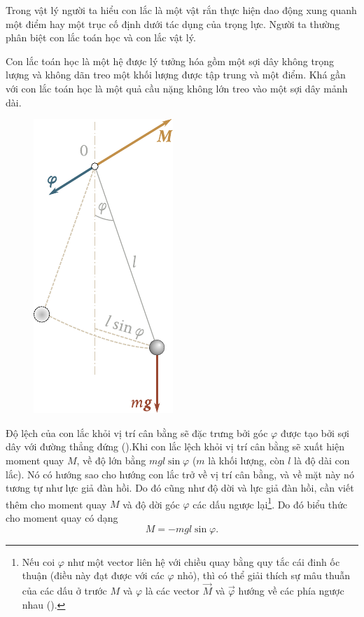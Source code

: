 Trong vật lý người ta hiểu con lắc là một vật rắn thực hiện dao động xung quanh một điểm hay một trục cố định dưới tác dụng của trọng lực. Người ta thường phân biệt con lắc toán học và con lắc vật lý.

Con lắc toán học là một hệ được lý tưởng hóa gồm một sợi dây không trọng lượng và không dãn treo một khối lượng được tập trung và một điểm. Khá gần với con lắc toán học là một quả cầu nặng không lớn treo vào một sợi dây mảnh dài.

\begin{figure}[!htb]
	\begin{center}
		\includegraphics[scale=0.95]{figures/ch_07/fig_7_7.pdf}
		\caption[]{}
		\label{fig:7_7}
	\end{center}
\end{figure}

Độ lệch của con lắc khỏi vị trí cân bằng sẽ đặc trưng bởi góc $\varphi$ được tạo bởi sợi dây với đường thẳng đứng ().Khi con lắc lệch khỏi vị trí cân bằng sẽ xuất hiện moment quay $M$, về độ lớn bằng $mgl\sin\varphi$ ($m$ là khối lượng, còn $l$ là độ dài con lắc). Nó có hướng sao cho hướng con lắc trở về vị trí cân bằng, và về mặt này nó tương tự như lực giả đàn hồi. Do đó cũng như độ dời và lực giả đàn hồi, cần viết thêm cho moment quay $M$ và độ dời góc $\varphi$ các dấu ngược lại\footnote{Nếu coi $\varphi$ như một vector liên hệ với chiều quay bằng quy tắc cái đinh ốc thuận (điều này đạt được với các $\varphi$ nhỏ), thì có thể giải thích sự mâu thuẫn của các dấu ở trước $M$ và $\varphi$ là các vector $\vec{M}$ và $\vec{\varphi}$ hướng về các phía ngược nhau ().}. Do đó biểu thức cho moment quay có dạng
\begin{equation}\label{eq:7_71}
	M = -mgl\sin\varphi.
\end{equation}

